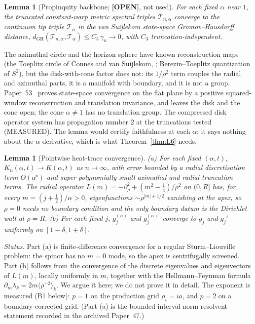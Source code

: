 \documentclass[11pt,a4paper]{article}
\theoremstyle{plain}
\newtheorem{lemma}[theorem]{Lemma}
\theoremstyle{definition}
\renewcommand{\_}{\textunderscore\allowbreak}
\begin{document}
\begin{lemma}[Propinquity backbone; \textbf{[OPEN]}, not used]
\label{lem:L6_backbone}
For each fixed $\alpha$ near $1$, the truncated constant-warp metric spectral
triples $\mathcal{T}_{n,\alpha}$ converge to the continuum tip triple
$\mathcal{T}_\alpha$ in the van Suijlekom state-space Gromov--Hausdorff
distance, $d_{\mathrm{GH}}(\mathcal{T}_{n,\alpha},\mathcal{T}_\alpha)
\le C_3\,\gamma_n\to0$, with $C_3$ truncation-independent.
\end{lemma}

\noindent The azimuthal circle and the horizon sphere have known
reconstruction maps (the Toeplitz circle of Connes and van Suijlekom,
\cite{paper44}; Berezin--Toeplitz quantization of $S^2$), but the
disk-with-cone factor does not: its $1/\rho^2$ term couples the radial and
azimuthal parts, it is a manifold with boundary, and it is not a group.
Paper~53~\cite{paper53} proves state-space convergence on the flat plane
by a positive squared-window reconstruction and translation invariance,
and leaves the disk and the cone open; the cone $\alpha\ne1$ has no
translation group. The compressed disk operator system has propagation
number $2$ at the truncations tested (MEASURED). The lemma
would certify faithfulness at each $\alpha$; it says nothing about the
$\alpha$-derivative, which is what Theorem~\ref{thm:L6} needs.

\begin{lemma}[Pointwise heat-trace convergence]
\label{lem:L6_rate}
(a) For each fixed $(\alpha,t)$, $K_n(\alpha,t)\to K(\alpha,t)$ as
$n\to\infty$, with error bounded by a radial discretisation term $O(a^{p})$
and super-polynomially small azimuthal and radial truncation terms. The
radial operator $L(m)=-\partial_\rho^2+(m^2-\tfrac14)/\rho^2$ on $(0,R]$ has,
for every $m=(j+\tfrac12)/\alpha>0$, eigenfunctions $\sim\rho^{|m|+1/2}$
vanishing at the apex, so $\rho=0$ needs no boundary condition and the only
boundary datum is the Dirichlet wall at $\rho=R$.
(b) For each fixed $j$, $g_j^{(n)}$ and $g_j^{(n)\prime}$ converge to $g_j$
and $g_j'$ uniformly on $[1-\delta,1+\delta]$.
\end{lemma}

\noindent\emph{Status.} Part (a) is finite-difference convergence for a
regular Sturm--Liouville problem: the spinor has no $m = 0$ mode, so the
apex is centrifugally screened. Part (b) follows from the convergence of
the discrete eigenvalues and eigenvectors of $L(m)$, locally uniformly in
$m$, together with the Hellmann--Feynman formula
$\partial_m\lambda_k=2m\langle\rho^{-2}\rangle_k$. We argue it here; we do
not prove it in detail. The exponent is measured (B1 below): $p=1$ on the
production grid $\rho_i=ia$, and $p=2$ on a boundary-corrected grid.
(Part (a) is the bounded-interval norm-resolvent statement recorded in the
archived Paper~47.)
\end{document}
